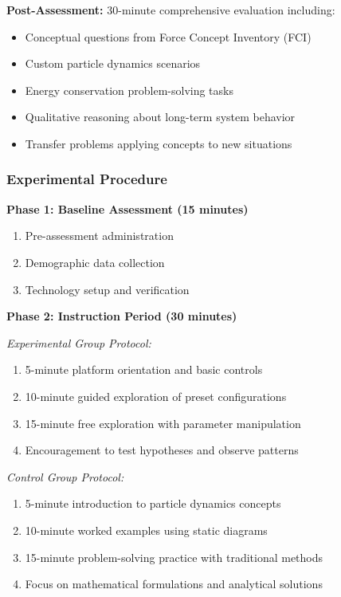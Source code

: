 \documentclass[12pt,journal,onecolumn]{IEEEtran}
\begin{document}
\textbf{Post-Assessment:} 30-minute comprehensive evaluation including:
\begin{itemize}
\item Conceptual questions from Force Concept Inventory (FCI)
\item Custom particle dynamics scenarios
\item Energy conservation problem-solving tasks
\item Qualitative reasoning about long-term system behavior
\item Transfer problems applying concepts to new situations
\end{itemize}

\subsubsection{Experimental Procedure}

\textbf{Phase 1: Baseline Assessment (15 minutes)}
\begin{enumerate}
\item Pre-assessment administration
\item Demographic data collection
\item Technology setup and verification
\end{enumerate}

\textbf{Phase 2: Instruction Period (30 minutes)}

\textit{Experimental Group Protocol:}
\begin{enumerate}
\item 5-minute platform orientation and basic controls
\item 10-minute guided exploration of preset configurations
\item 15-minute free exploration with parameter manipulation
\item Encouragement to test hypotheses and observe patterns
\end{enumerate}

\textit{Control Group Protocol:}
\begin{enumerate}
\item 5-minute introduction to particle dynamics concepts
\item 10-minute worked examples using static diagrams
\item 15-minute problem-solving practice with traditional methods
\item Focus on mathematical formulations and analytical solutions
\end{enumerate}
\end{document}
